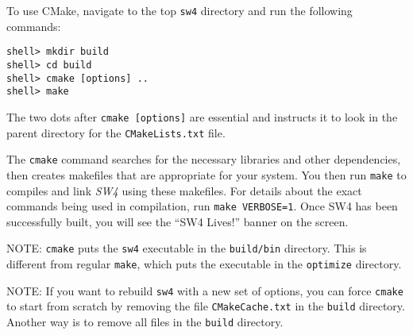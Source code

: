\documentclass[11pt]{article}
\begin{document}
To use CMake, navigate to the top {\tt sw4} directory and run the following commands:
\begin{verbatim}
shell> mkdir build
shell> cd build
shell> cmake [options] ..
shell> make
\end{verbatim}
The two dots after {\tt cmake [options]} are essential and instructs it to look in the parent
directory for the {\tt CMakeLists.txt} file.
 
The \verb+cmake+ command searches for the necessary libraries and other dependencies, then creates
makefiles that are appropriate for your system. You then run \verb+make+ to compiles and link
\emph{SW4} using these makefiles. For details about the exact commands being used in compilation,
run \texttt{make VERBOSE=1}.  Once SW4 has been successfully built, you will see the
``SW4 Lives!'' banner on the screen.

NOTE: \verb+cmake+ puts the \verb+sw4+ executable in the \verb+build/bin+ directory. This is
different from regular {\tt make}, which puts the executable in the \verb+optimize+
directory.

NOTE: If you want to rebuild \verb+sw4+ with a new set of options, you can force \verb+cmake+ to start
from scratch by removing the file \verb+CMakeCache.txt+ in the \verb+build+ directory. Another way
is to remove all files in the \verb+build+ directory.
\end{document}
